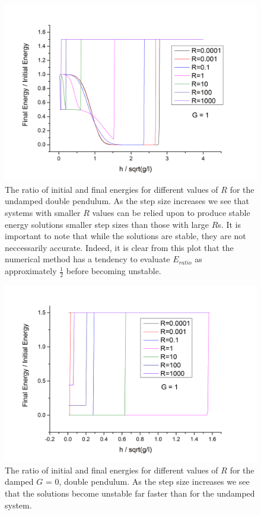 \documentclass[11pt]{article}
\begin{document}
\begin{figure}[h]
	\begin{center}
		\includegraphics[width=\textwidth]{img/dp/e_ratio_vs_h_G=0.png}
		\caption{The ratio of initial and final energies for different values of $R$ for the undamped double pendulum. As the step size increases we see that systems with smaller $R$ values can be relied upon to produce stable energy solutions smaller step sizes than those with large $R$s. It is important to note that while the solutions are stable, they are not neccessarily accurate. Indeed, it is clear from this plot that the numerical method has a tendency to evaluate $E_{ratio}$ as approximately $\frac{1}{2}$ before becoming unstable.}
		\label{fig:dp_e_vs_h_G0}
	\end{center}
\end{figure}

\begin{figure}[h]
	\begin{center}
		\includegraphics[width=\textwidth]{img/dp/e_ratio_vs_h_G=1.png}
		\caption{The ratio of initial and final energies for different values of $R$ for the damped $G$ = 0, double pendulum. As the step size increases we see that the solutions become unstable far faster than  for the undamped system.}
		\label{fig:dp_e_vs_h_G1}
	\end{center}
\end{figure}
\end{document}
